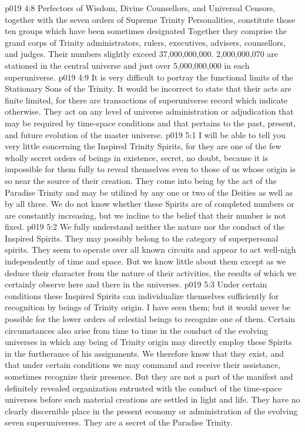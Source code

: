\vs p019 4:8 \pc Perfectors of Wisdom, Divine Counsellors, and Universal Censors, together with the seven orders of Supreme Trinity Personalities, constitute those ten groups which have been sometimes designated  Together they comprise the grand corps of Trinity administrators, rulers, executives, advisers, counsellors, and judges. Their numbers slightly exceed 37,000,000,000. 2,000,000,070 are stationed in the central universe and just over 5,000,000,000 in each superuniverse.
\vs p019 4:9 It is very difficult to portray the functional limits of the Stationary Sons of the Trinity. It would be incorrect to state that their acts are finite limited, for there are transactions of superuniverse record which indicate otherwise. They act on any level of universe administration or adjudication that may be required by time\hyp{}space conditions and that pertains to the past, present, and future evolution of the master universe.
\vs p019 5:1 I will be able to tell you very little concerning the Inspired Trinity Spirits, for they are one of the few wholly secret orders of beings in existence, secret, no doubt, because it is impossible for them fully to reveal themselves even to those of us whose origin is so near the source of their creation. They come into being by the act of the Paradise Trinity and may be utilized by any one or two of the Deities as well as by all three. We do not know whether these Spirits are of completed numbers or are constantly increasing, but we incline to the belief that their number is not fixed.
\vs p019 5:2 We fully understand neither the nature nor the conduct of the Inspired Spirits. They may possibly belong to the category of superpersonal spirits. They seem to operate over all known circuits and appear to act well\hyp{}nigh independently of time and space. But we know little about them except as we deduce their character from the nature of their activities, the results of which we certainly observe here and there in the universes.
\vs p019 5:3 Under certain conditions these Inspired Spirits can individualize themselves sufficiently for recognition by beings of Trinity origin. I have seen them; but it would never be possible for the lower orders of celestial beings to recognize one of them. Certain circumstances also arise from time to time in the conduct of the evolving universes in which any being of Trinity origin may directly employ these Spirits in the furtherance of his assignments. We therefore know that they exist, and that under certain conditions we may command and receive their assistance, sometimes recognize their presence. But they are not a part of the manifest and definitely revealed organization entrusted with the conduct of the time\hyp{}space universes before such material creations are settled in light and life. They have no clearly discernible place in the present economy or administration of the evolving seven superuniverses. They are a secret of the Paradise Trinity.
